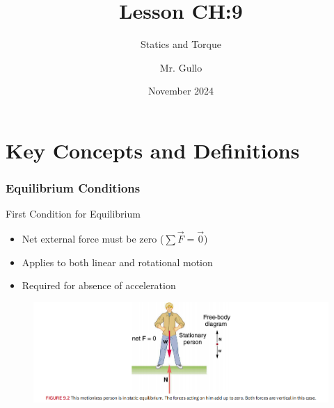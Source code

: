 \documentclass{beamer}
\title{Lesson CH:9}
\subtitle{Statics and Torque}
\author{Mr. Gullo}
\date{November 2024}
\begin{document}
\frame{\titlepage}

\section{Key Concepts and Definitions}
\begin{frame}
\frametitle{Equilibrium Conditions}

\begin{block}{First Condition for Equilibrium}
\begin{itemize}
    \item Net external force must be zero ($\sum \vec{F} = \vec{0}$)
    \item Applies to both linear and rotational motion
    \item Required for absence of acceleration
\end{itemize}
\end{block}

\begin{figure}
    \centering
    \includegraphics[width=0.8\linewidth]{Screenshot 2024-11-04 115835.png}
\end{figure}
\end{frame}
\end{document}
